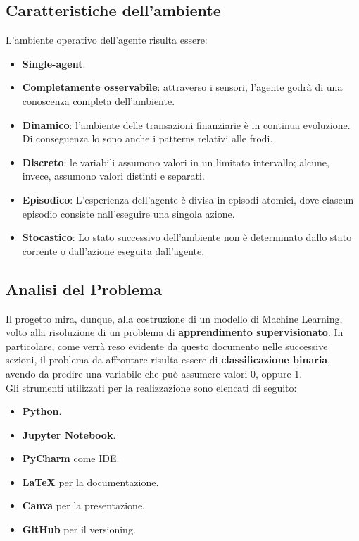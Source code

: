 \documentclass[]{article}
\begin{document}
    \subsection{Caratteristiche dell'ambiente}
        L'ambiente operativo dell'agente risulta essere:
        \begin{itemize}
            \item \textbf{Single-agent}.
            \item \textbf{Completamente osservabile}: attraverso i sensori, l'agente godrà di una conoscenza completa dell'ambiente.
            \item \textbf{Dinamico}: l'ambiente delle transazioni finanziarie è in continua evoluzione. Di conseguenza lo sono anche i patterns relativi alle frodi.
            \item \textbf{Discreto}: le variabili assumono valori in un limitato intervallo; alcune, invece, assumono valori distinti e separati.
            \item \textbf{Episodico}: L'esperienza dell'agente è divisa in episodi atomici, dove ciascun episodio consiste nall'eseguire una singola azione.
            \item \textbf{Stocastico}: Lo stato successivo dell'ambiente non è determinato dallo stato corrente o dall'azione eseguita dall'agente.
        \end{itemize}

    \subsection{Analisi del Problema}
        Il progetto mira, dunque, alla costruzione di un modello di Machine Learning, volto alla risoluzione di un problema di \textbf{apprendimento supervisionato}. In particolare, come verrà reso evidente da questo documento nelle successive sezioni, il problema da affrontare risulta essere di \textbf{classificazione binaria}, avendo da predire una variabile che può assumere valori 0, oppure 1.\\
        Gli strumenti utilizzati per la realizzazione sono elencati di seguito:
        \begin{itemize}
            \item \textbf{Python}.
            \item \textbf{Jupyter Notebook}.
            \item \textbf{PyCharm} come IDE.
            \item \textbf{LaTeX} per la documentazione.
            \item \textbf{Canva} per la presentazione.
            \item \textbf{GitHub} per il versioning.
        \end{itemize}
\end{document}
